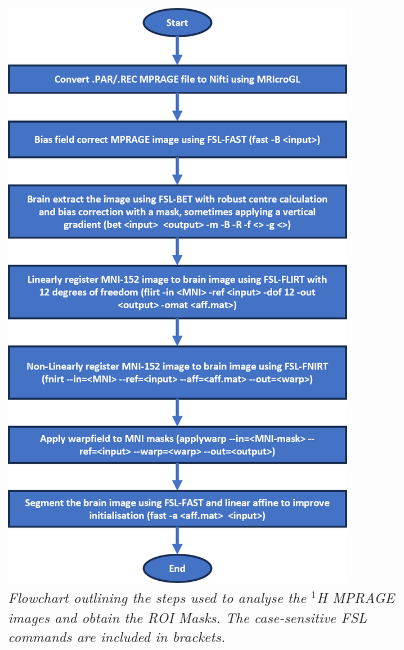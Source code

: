 \begin{figure}
    \centering
    \includegraphics[width = 0.8\textwidth]{Figures/Glucose/Flow_Image.png}
    \caption{\textit{Flowchart outlining the steps used to analyse the $^1$H MPRAGE images and obtain the \ac{ROI} Masks. The case-sensitive FSL commands are included in brackets.}}
    \label{fig:Glu:1H_Flow}
\end{figure}

